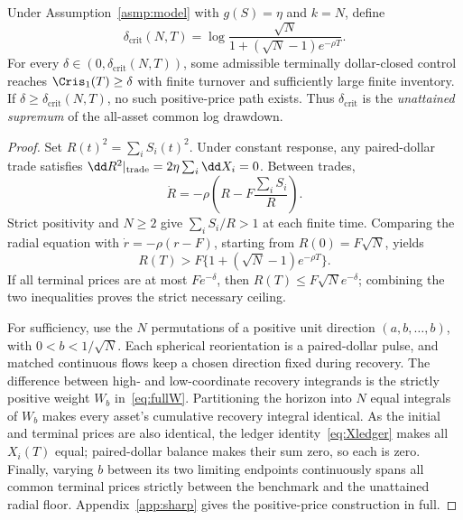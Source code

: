 \documentclass[review,hidelinks,onefignum,onetabnum]{siamonline250211}
\begin{document}
\begin{theorem}\label{thm:critical}
Under Assumption~\ref{asmp:model} with $g(S)=\eta$ and $k=N$, define
\begin{equation}\label{eq:critical}
\delta_{\mathrm{crit}}(N,T)=
\log\frac{\sqrt N}{1+(\sqrt N-1)e^{-\rho T}}.
\end{equation}
For every $\delta\in(0,\delta_{\mathrm{crit}}(N,T))$, some admissible terminally dollar-closed control reaches $\Cris_1(T)\ge\delta$ with finite turnover and sufficiently large finite inventory. If $\delta\ge\delta_{\mathrm{crit}}(N,T)$, no such positive-price path exists. Thus $\delta_{\mathrm{crit}}$ is the \emph{unattained supremum} of the all-asset common log drawdown.
\end{theorem}
\begin{proof}
Set $R(t)^2=\sum_iS_i(t)^2$. Under constant response,
any paired-dollar trade satisfies
$\dd R^2|_{\rm trade}=2\eta\sum_i\dd X_i=0$.
Between trades,
\[
\dot R=-\rho\left(R-F\frac{\sum_iS_i}{R}\right).
\]
Strict positivity and $N\ge2$ give
$\sum_iS_i/R>1$ at each finite time. Comparing the
radial equation with $\dot r=-\rho(r-F)$, starting from
$R(0)=F\sqrt N$, yields
\[
R(T)>F\{1+(\sqrt N-1)e^{-\rho T}\}.
\]
If all terminal prices are at most $Fe^{-\delta}$,
then $R(T)\le F\sqrt N e^{-\delta}$; combining the
two inequalities proves the strict necessary ceiling.

For sufficiency, use the $N$ permutations of a positive
unit direction $(a,b,\ldots,b)$, with
$0<b<1/\sqrt N$. Each spherical reorientation is a
paired-dollar pulse, and matched continuous flows keep
a chosen direction fixed during recovery. The difference
between high- and low-coordinate recovery integrands is
the strictly positive weight $W_b$ in~\eqref{eq:fullW}.
Partitioning the horizon into $N$ equal integrals of
$W_b$ makes every asset's cumulative recovery integral
identical. As the initial and terminal prices are also
identical, the ledger identity~\eqref{eq:Xledger} makes
all $X_i(T)$ equal; paired-dollar balance makes their
sum zero, so each is zero. Finally, varying $b$ between
its two limiting endpoints continuously spans all common
terminal prices strictly between the benchmark and the
unattained radial floor. Appendix~\ref{app:sharp} gives
the positive-price construction in full.
\end{proof}
\end{document}
